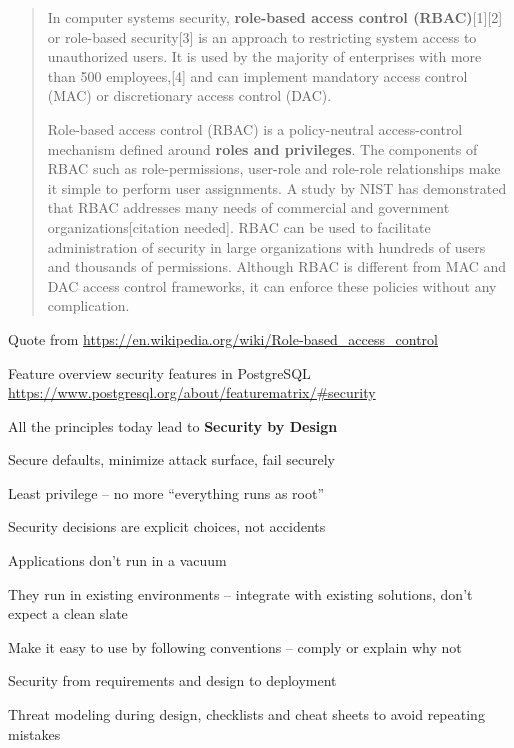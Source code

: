 \documentclass[Screen16to9,17pt]{foils}
\begin{document}
\begin{quote}
In computer systems security, {\bf role-based access control (RBAC)}[1][2] or role-based security[3] is an approach to restricting system access to unauthorized users. It is used by the majority of enterprises with more than 500 employees,[4] and can implement mandatory access control (MAC) or discretionary access control (DAC).

Role-based access control (RBAC) is a policy-neutral access-control mechanism defined around {\bf roles and privileges}. The components of RBAC such as role-permissions, user-role and role-role relationships make it simple to perform user assignments. A study by NIST has demonstrated that RBAC addresses many needs of commercial and government organizations[citation needed]. RBAC can be used to facilitate administration of security in large organizations with hundreds of users and thousands of permissions. Although RBAC is different from MAC and DAC access control frameworks, it can enforce these policies without any complication.
\end{quote}
Quote from \url{https://en.wikipedia.org/wiki/Role-based_access_control}




Feature overview security features in PostgreSQL\\
\url{https://www.postgresql.org/about/featurematrix/#security}



\begin{list1}
\item All the principles today lead to {\bfseries Security by Design}
\begin{list2}
\item Secure defaults, minimize attack surface, fail securely
\item Least privilege -- no more ``everything runs as root''
\item Security decisions are explicit choices, not accidents
\end{list2}
\item Applications don't run in a vacuum
\begin{list2}
\item They run in existing environments -- integrate with existing solutions, don't expect a clean slate
\item Make it easy to use by following conventions -- comply or explain why not
\end{list2}
\item Security from requirements and design to deployment
\begin{list2}
\item Threat modeling during design, checklists and cheat sheets to avoid repeating mistakes
\end{list2}
\end{list1}
\end{document}
